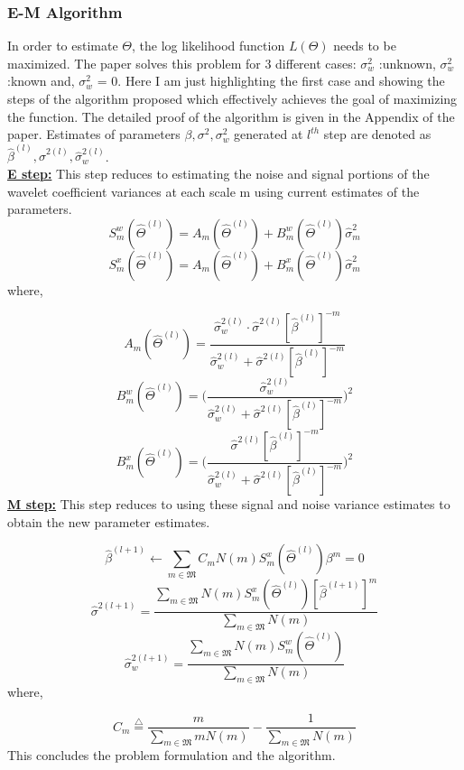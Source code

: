 \documentclass[a4paper]{article}
\begin{document}
\subsubsection{E-M Algorithm}
In order to estimate $\Theta$, the log likelihood function $L(\Theta)$ needs to be maximized. The paper solves this problem for 3 different cases:  $\sigma_w^2$ :unknown, $\sigma_w^2$ :known and, $\sigma_w^2$ = 0. Here I am just highlighting the first case and showing the steps of the algorithm proposed which effectively achieves the goal of maximizing the function. The detailed proof of the algorithm is given in the Appendix of the paper. Estimates of parameters  $\beta ,\sigma^2, \sigma_w^2$ generated at $l^{th}$ step are denoted as $\hat{\beta}^{(l)} ,\hat{\sigma}^{2(l)}, \hat{\sigma}_w^{2(l)}$. \\
\underline{\textbf{E step:}} This step reduces to estimating the noise and signal portions of the wavelet coefficient variances at each scale m using current estimates of the parameters.
$$ S_m^w(\hat{\Theta}^{(l)}) = A_m(\hat{\Theta}^{(l)}) + B_m^w(\hat{\Theta}^{(l)})\hat{\sigma}_m^2 $$
$$ S_m^x(\hat{\Theta}^{(l)}) = A_m(\hat{\Theta}^{(l)}) + B_m^x(\hat{\Theta}^{(l)})\hat{\sigma}_m^2 $$
where,


$$A_m(\hat{\Theta}^{(l)}) = \frac{\hat{\sigma}_w^{2(l)}\cdot \hat{\sigma}^{2(l)} [\hat{\beta}^{(l)}]^{-m} }{\hat{\sigma}_w^{2(l)} + \hat{\sigma}^{2(l)} [\hat{\beta}^{(l)}]^{-m}} $$
$$B^w_m(\hat{\Theta}^{(l)}) = \bigg ( \frac{\hat{\sigma}_w^{2(l)}}{\hat{\sigma}_w^{2(l)} + \hat{\sigma}^{2(l)} [\hat{\beta}^{(l)}]^{-m}} \bigg )^2$$
$$B^x_m(\hat{\Theta}^{(l)}) = \bigg (\frac{\hat{\sigma}^{2(l)} [\hat{\beta}^{(l)}]^{-m} }{\hat{\sigma}_w^{2(l)} + \hat{\sigma}^{2(l)} [\hat{\beta}^{(l)}]^{-m}} \bigg )^2 $$
\underline{\textbf{M step:}}  This step reduces to using these signal and noise variance estimates to obtain the new parameter estimates.

$$ \hat{\beta}^{(l+1)} \leftarrow \sum_{m \in \mathfrak{M}} C_m N(m)S_m^x (\hat{\Theta}^{(l)}) \beta^m = 0 $$
$$ \hat{\sigma}^{2(l+1)} = \frac{\sum_{m \in \mathfrak{M}} N(m)S_m^x (\hat{\Theta}^{(l)})[\hat{\beta}^{(l+1)}]^m }{\sum_{m \in \mathfrak{M}} N(m)}$$
$$ \hat{\sigma}_w^{2(l+1)} = \frac{\sum_{m \in \mathfrak{M}} N(m)S_m^w (\hat{\Theta}^{(l)}) }{\sum_{m \in \mathfrak{M}} N(m)}$$
where, 

$$C_m \overset{\triangle}{= } \frac{m}{\sum_{m \in \mathfrak{M}} m N(m)} - \frac{1}{\sum_{m \in \mathfrak{M}} N(m)} $$
This concludes the problem formulation and the algorithm.
\end{document}
